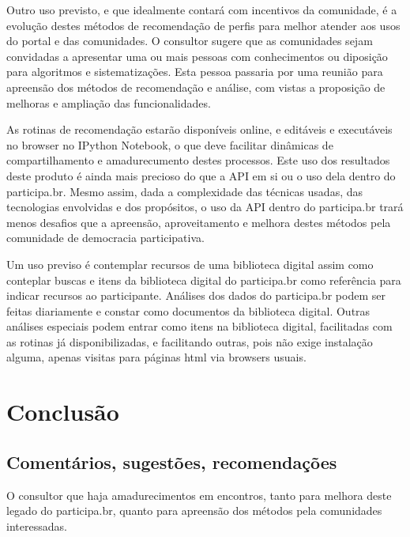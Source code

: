 \documentclass[12pt]{article}
\begin{document}
Outro uso previsto, e que idealmente contará com incentivos da comunidade, é a evolução destes métodos de recomendação de perfis para melhor atender aos usos do portal e das comunidades. O consultor sugere que as comunidades sejam convidadas a apresentar uma ou mais pessoas com conhecimentos ou diposição para algoritmos e sistematizações. Esta pessoa passaria por uma reunião para apreensão dos métodos de recomendação e análise, com vistas a proposição de melhoras e ampliação das funcionalidades.

As rotinas de recomendação estarão disponíveis online, e editáveis e executáveis no browser no IPython Notebook, o que deve facilitar dinâmicas de compartilhamento e amadurecumento destes processos. Este uso dos resultados deste produto é ainda mais precioso do que a API em si ou o uso dela dentro do participa.br. Mesmo assim, dada a complexidade das técnicas usadas, das tecnologias envolvidas e dos propósitos, o uso da API dentro do participa.br trará menos desafios que a apreensão, aproveitamento e melhora destes métodos pela comunidade de democracia participativa.

Um uso previso é contemplar recursos de uma biblioteca digital assim como conteplar buscas e itens da biblioteca digital do participa.br como referência para indicar recursos ao participante. Análises dos dados do participa.br podem ser feitas diariamente e constar como documentos da biblioteca digital. Outras análises especiais podem entrar como itens na biblioteca digital, facilitadas com as rotinas já disponibilizadas, e facilitando outras, pois não exige instalação alguma, apenas visitas para páginas html via browsers usuais.

\section{Conclusão}
\subsection{Comentários, sugestões, recomendações}
O consultor que haja amadurecimentos em encontros, tanto para melhora deste legado do participa.br, quanto para apreensão dos métodos pela comunidades interessadas. 
\end{document}
